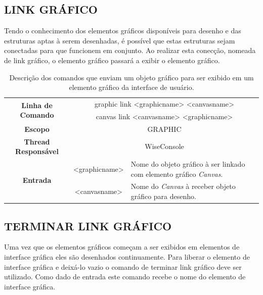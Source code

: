 \subsection{LINK GRÁFICO}\label{sec:graphic_link}

Tendo o conhecimento dos elementos gráficos disponíveis para desenho e das estruturas aptas à serem desenhadas, é possível que estas estruturas sejam conectadas para que funcionem em conjunto. Ao realizar esta conecção, nomeada de link gráfico, o elemento gráfico passará a exibir o elemento gráfico.

\begin{center}
	\begin{table}[!htbp]
		\begin{tabularx}{\textwidth}{c|c|X}
			\toprule
			\multirow{2}{*}{\textbf{Linha de Comando}} & \multicolumn{2}{c}{graphic link <graphic\underline{\space\space}name> <canvas\underline{\space\space}name>} \\
			& \multicolumn{2}{c}{canvas link <canvas\underline{\space\space}name> <graphic\underline{\space\space}name>} \\
			\midrule
			\textbf{Escopo} & \multicolumn{2}{c}{GRAPHIC} \\
			\hline
			\textbf{Thread Responsável} & \multicolumn{2}{c}{WiseConsole} \\
			\hline
			\multirow{2}{*}{\textbf{Entrada}} &  <graphic\underline{\space\space}name> & Nome do objeto gráfico à ser linkado com elemento gráfico \textit{Canvas}. \\
			& <canvas\underline{\space\space}name> & Nome do \textit{Canvas} à receber objeto gráfico para desenho. \\
			\bottomrule
		\end{tabularx}
		\caption{Descrição dos comandos que enviam um objeto gráfico para ser exibido em um elemento gráfico da interface de usuário.}
		\label{tab:graphic_link}
	\end{table}
\end{center}

\subsection{TERMINAR LINK GRÁFICO}\label{sec:graphic_purge}

Uma vez que os elementos gráficos começam a ser exibidos em elementos de interface gráfica eles são desenhados continuamente. Para liberar o elemento de interface gráfica e deixá-lo vazio o comando de terminar link gráfico deve ser utilizado. Como dado de entrada este comando recebe o nome do elemento de interface gráfica.

